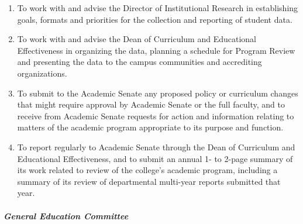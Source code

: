 \documentclass[letterpaper, 11pt]{article}
\begin{document}
\begin{enumerate}[label=\alph*)]
{\begin{enumerate}[label=\arabic*)]
{\begin{enumerate}[label=(\alph*)]
										\item{to review the results of the multi-year review and provide timely feedback for the department to consider for its meeting with the Provost and the Dean of Curriculum and Educational Effectiveness;}
										\item{to provide the department with comments or suggestions to assist them in their preparation for the next review cycle;}
										\item{to encourage a campus conversation that establishes the value of a college-wide program review and addresses concerns as appropriate.}
									\end{enumerate}
								}
								\item{To work with and advise the Director of Institutional Research in establishing goals, formats and priorities for the collection and reporting of student data.}
								\item{To work with and advise the Dean of Curriculum and Educational Effectiveness in organizing the data, planning a schedule for Program Review and presenting the data to the campus communities and accrediting organizations.}
								\item{To submit to the Academic Senate any proposed policy or curriculum changes that might require approval by Academic Senate or the full faculty, and to receive from Academic Senate requests for action and information relating to matters of the academic program appropriate to its purpose and function.}
								\item{To report regularly to Academic Senate through the Dean of Curriculum and Educational Effectiveness, and to submit an annual 1- to 2-page summary of its work related to review of the college's academic program, including a summary of its review of departmental multi-year reports submitted that year.}
							\end{enumerate}
						}
					\end{enumerate}
				\subparagraph{General Education Committee}
\end{document}
